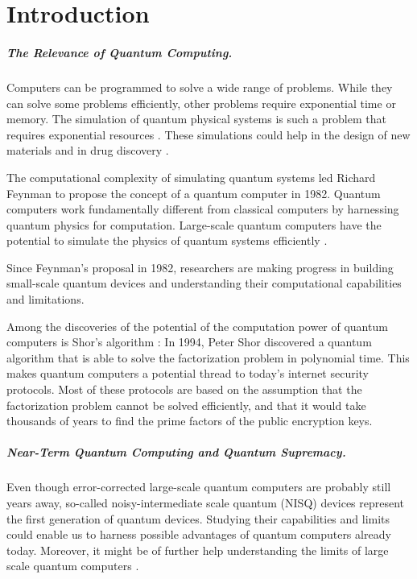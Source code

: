 \chapter{Introduction}

\paragraph{The Relevance of Quantum Computing.}
Computers can be programmed to solve a wide range of problems.
While they can solve some problems efficiently, 
other problems require exponential time or memory. The simulation 
of quantum physical systems is such a problem that requires 
exponential resources \cite{nielsen2002quantum}.  
These simulations could help in the design 
of new materials and in drug discovery \cite{8585034}.

The computational complexity of simulating quantum systems led 
Richard Feynman to propose the concept of a quantum computer \cite{feynman1982simulating} in 1982. 
Quantum computers work fundamentally different from classical computers by 
harnessing quantum physics for computation. Large-scale quantum computers have the potential
to simulate the physics of quantum systems efficiently \cite{Zalka_1998}.

Since Feynman's proposal in 1982, researchers are making progress in building small-scale 
quantum devices and understanding their computational capabilities and limitations.

Among the discoveries of the potential of the computation power of quantum computers is Shor's algorithm \cite{shor1997factorisation}: 
In 1994, Peter Shor discovered a quantum algorithm that is able to solve the 
factorization problem in polynomial time. This makes quantum computers a potential thread to 
today's internet security protocols. Most of these protocols are based on the assumption 
that the factorization problem cannot be solved efficiently, and that it would take thousands of years to find the 
prime factors of the public encryption keys.

\paragraph{Near-Term Quantum Computing and Quantum Supremacy.}
Even though error-corrected large-scale quantum computers are probably still 
years away, so-called noisy-intermediate scale 
quantum (NISQ) devices represent the first generation of quantum devices.
Studying their capabilities and limits could enable us to harness possible advantages 
of quantum computers already today. Moreover, it might be of further help understanding
the limits of large scale quantum computers \cite{Preskill_2018}.


